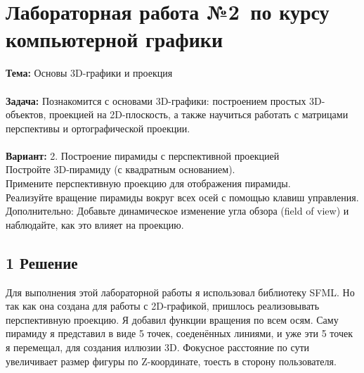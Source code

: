 \documentclass[12pt]{article}
\begin{document}




\section*{Лабораторная работа №2\, по курсу компьютерной графики}

\textbf{Тема:} Основы 3D-графики и проекция\\
\\
\textbf{Задача:} Познакомится с основами 3D-графики: построением простых 3D-объектов, проекцией на 2D-плоскость, а также научиться работать с матрицами перспективы и ортографической проекции. \\
\\
\textbf{Вариант:} 2. Построение пирамиды с перспективной проекцией\\
Постройте 3D-пирамиду (с квадратным основанием).\\
Примените перспективную проекцию для отображения пирамиды.\\
Реализуйте вращение пирамиды вокруг всех осей с помощью клавиш управления.\\
Дополнительно: Добавьте динамическое изменение угла обзора (field of view) и наблюдайте, как это влияет на проекцию.\\


\subsection*{1 Решение}

Для выполнения этой лабораторной работы я использовал библиотеку SFML. Но так как она создана для работы с 2D-графикой, пришлось реализовывать перспективную проекцию. 
Я добавил функции вращения по всем осям. Саму пирамиду я представил в виде 5 точек, соеденённых линиями, и уже эти 5 точек я перемещал, для создания иллюзии 3D. Фокусное расстояние
по сути увеличивает размер фигуры по Z-координате, тоесть в сторону пользователя.
\end{document}
